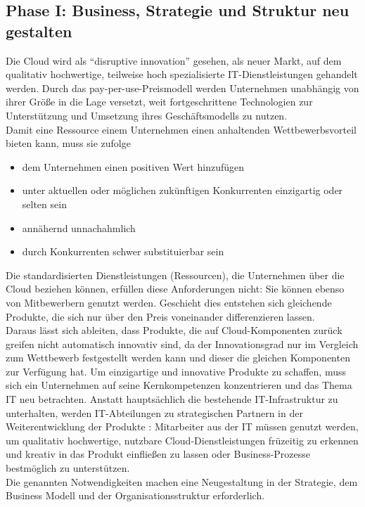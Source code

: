 \subsection{Phase I: Business, Strategie und Struktur neu gestalten}
\label{cha:phaseI}
Die Cloud wird als ``disruptive innovation'' gesehen, als neuer Markt, auf dem qualitativ hochwertige, teilweise hoch spezialisierte IT-Dienstleistungen gehandelt werden.  Durch das pay-per-use-Preismodell werden Unternehmen unabhängig von ihrer Größe in die Lage versetzt, weit fortgeschrittene Technologien zur Unterstützung und Umsetzung ihres Geschäftsmodells zu nutzen.  \\
Damit eine Ressource einem Unternehmen einen anhaltenden Wettbewerbsvorteil bieten kann, muss sie
 zufolge
\begin{itemize}
  \item dem Unternehmen einen positiven Wert hinzufügen
  \item unter aktuellen oder möglichen zukünftigen Konkurrenten einzigartig oder selten sein
  \item annähernd unnachahmlich
  \item durch Konkurrenten schwer substituierbar sein
\end{itemize}

Die standardisierten Dienstleistungen (Ressourcen), die Unternehmen über die Cloud beziehen können, erfüllen diese Anforderungen nicht: Sie können ebenso von Mitbewerbern genutzt werden. Geschieht dies entstehen sich gleichende Produkte, die sich nur über den Preis voneinander differenzieren lassen.  \\
Daraus lässt sich ableiten, dass Produkte, die auf Cloud-Komponenten zurück greifen nicht automatisch innovativ sind, da der Innovationsgrad nur im Vergleich zum Wettbewerb festgestellt werden kann und dieser die gleichen Komponenten zur Verfügung hat. Um einzigartige und innovative Produkte zu schaffen, muss sich ein Unternehmen auf seine Kernkompetenzen konzentrieren und das Thema IT neu betrachten. Anstatt hauptsächlich die bestehende IT-Infrastruktur zu unterhalten, werden IT-Abteilungen zu strategischen Partnern in der Weiterentwicklung der Produkte : Mitarbeiter aus der IT müssen genutzt werden, um qualitativ hochwertige, nutzbare Cloud-Dienstleistungen früzeitig zu erkennen und kreativ in das Produkt einfließen zu lassen oder Business-Prozesse bestmöglich zu unterstützen. \\
Die genannten Notwendigkeiten machen eine Neugestaltung in der Strategie, dem Business Modell und der Organisationsstruktur erforderlich.

